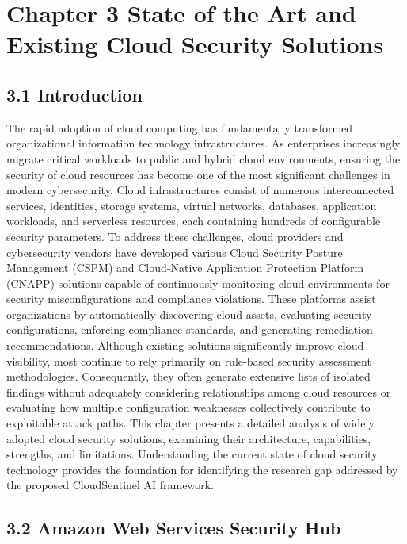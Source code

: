 \section{Chapter 3 State of the Art and Existing Cloud Security Solutions}

\subsection{3.1 Introduction}

The rapid adoption of cloud computing has fundamentally transformed organizational information technology infrastructures. As enterprises increasingly migrate critical workloads to public and hybrid cloud environments, ensuring the security of cloud resources has become one of the most significant challenges in modern cybersecurity. Cloud infrastructures consist of numerous interconnected services, identities, storage systems, virtual networks, databases, application workloads, and serverless resources, each containing hundreds of configurable security parameters. To address these challenges, cloud providers and cybersecurity vendors have developed various Cloud Security Posture Management (CSPM) and Cloud-Native Application Protection Platform (CNAPP) solutions capable of continuously monitoring cloud environments for security misconfigurations and compliance violations. These platforms assist organizations by automatically discovering cloud assets, evaluating security configurations, enforcing compliance standards, and generating remediation recommendations. Although existing solutions significantly improve cloud visibility, most continue to rely primarily on rule-based security assessment methodologies. Consequently, they often generate extensive lists of isolated findings without adequately considering relationships among cloud resources or evaluating how multiple configuration weaknesses collectively contribute to exploitable attack paths. This chapter presents a detailed analysis of widely adopted cloud security solutions, examining their architecture, capabilities, strengths, and limitations. Understanding the current state of cloud security technology provides the foundation for identifying the research gap addressed by the proposed CloudSentinel AI framework.

\subsection{3.2 Amazon Web Services Security Hub}

